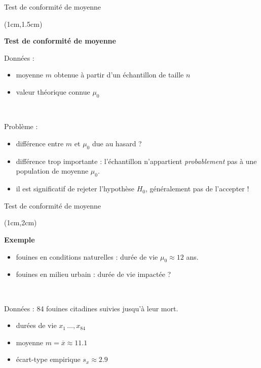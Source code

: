 \documentclass{beamer}
\begin{document}
\begin{frame}{Test de conformité de moyenne}
\begin{textblock*}{\textwidth}(1cm,1.5cm)

\begin{center}{\bf \Large Test de conformité de moyenne } \end{center}

Données :
\begin{itemize}
\item  moyenne  $m$ obtenue à partir d'un échantillon de taille $n$
\item   valeur théorique connue $\mu_0$
\end{itemize}

\

Problème :

\begin{itemize}
\item différence entre $m$ et $\mu_0$ due au hasard ?
\item différence trop importante :  
l'échantillon n'appartient \emph{probablement} pas à une population de moyenne $\mu_0$.
\item il est significatif de rejeter l'hypothèse $H_0$, généralement pas de l'accepter !
\end{itemize}

\end{textblock*}

\end{frame}
 
 

\begin{frame}{Test de conformité de moyenne}
\begin{textblock*}{\textwidth}(1cm,2cm)

\begin{center}{\bf \Large Exemple } \end{center}


\begin{itemize}
\item fouines en conditions naturelles : durée de vie $\mu_0\approx 12$ ans.
\item fouines en milieu urbain : durée de vie  impactée ?
\end{itemize}

\

Données : 84 fouines citadines suivies jusqu'à leur mort. 
\begin{itemize}
\item durées de vie $x_1\,\hdots,x_{84}$
\item moyenne $m = \overline{x} \approx 11.1$
\item écart-type empirique $s_x\approx 2.9$
\end{itemize}

\end{textblock*}

\end{frame}
\end{document}
